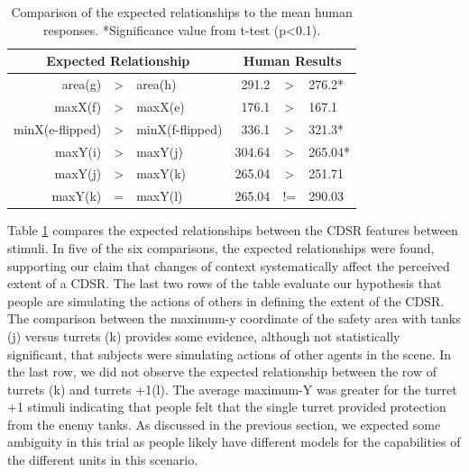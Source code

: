 \documentclass[11pt,letterpaper]{article}
\begin{document}
\begin{table}[htb]
\begin{center}
\begin{tabular}{r c l r c l}
\multicolumn{3}{c}{Expected Relationship} & \multicolumn{3}{c}{Human Results}  \\
\hline
\hline
area(g) &>& area(h) & 291.2 & >& 276.2* \\
maxX(f) &>& maxX(e) & 176.1& >& 167.1 \\
minX(e-flipped) &>& minX(f-flipped) & 336.1& >& 321.3* \\
maxY(i) &>& maxY(j) & 304.64 &>& 265.04* \\
maxY(j) &>& maxY(k) & 265.04 &>& 251.71 \\
maxY(k) &=& maxY(l) & 265.04 &!=& 290.03 \\
\hline
\end{tabular}
\end{center}
\caption{Comparison of the expected relationships to the mean human responses. *Significance value from t-test (p<0.1).}
\label{tab:region-location-tests}
\end{table}


Table \ref{tab:region-location-tests} compares the expected relationships between the CDSR features between stimuli.  In five of the six comparisons, the expected relationships were found, supporting our claim that changes of context systematically affect the perceived extent of a CDSR.  The last two rows of the table evaluate our hypothesis that people are simulating the actions of others in defining the extent of the CDSR.  The comparison between the maximum-y coordinate of the safety area with tanks (j) versus turrets (k) provides some evidence, although not statistically significant, that subjects were simulating actions of other agents in the scene.  In the last row, we did not observe the expected relationship between the row of turrets (k) and turrets +1(l).  The average maximum-Y was greater for the turret +1 stimuli indicating that people felt that the single turret provided protection from the enemy tanks.  As discussed in the previous section, we expected some ambiguity in this trial as people likely have different models for the capabilities of the different units in this scenario.


\end{document}

